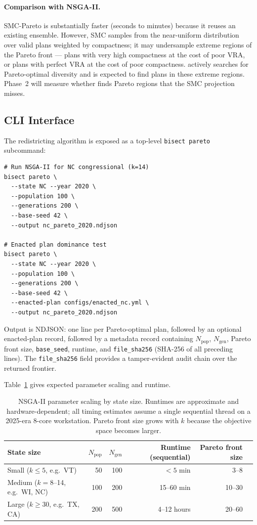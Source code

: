 \paragraph{Comparison with NSGA-II.}
SMC-Pareto is substantially faster (seconds to minutes) because it reuses
an existing ensemble.
However, SMC samples from the near-uniform distribution over valid plans
weighted by compactness; it may undersample extreme regions of the Pareto
front --- plans with very high compactness at the cost of poor VRA, or plans
with perfect VRA at the cost of poor compactness.
\nsga{} actively searches for Pareto-optimal diversity and is expected to
find plans in these extreme regions.
Phase~2 will measure whether \nsga{} finds Pareto regions that the SMC
projection misses.

\subsection{CLI Interface}

The \nsga{} redistricting algorithm is exposed as a top-level
\texttt{bisect pareto} subcommand:

\begin{verbatim}
# Run NSGA-II for NC congressional (k=14)
bisect pareto \
  --state NC --year 2020 \
  --population 100 \
  --generations 200 \
  --base-seed 42 \
  --output nc_pareto_2020.ndjson

# Enacted plan dominance test
bisect pareto \
  --state NC --year 2020 \
  --population 100 \
  --generations 200 \
  --base-seed 42 \
  --enacted-plan configs/enacted_nc.yml \
  --output nc_pareto_2020.ndjson
\end{verbatim}

Output is NDJSON: one line per Pareto-optimal plan, followed by an optional
enacted-plan record, followed by a metadata record containing
$N_{\mathrm{pop}}$, $N_{\mathrm{gen}}$, Pareto front size, \texttt{base\_seed},
runtime, and \texttt{file\_sha256} (SHA-256 of all preceding lines).
The \texttt{file\_sha256} field provides a tamper-evident audit chain over
the returned frontier.

Table~\ref{tab:scaling} gives expected parameter scaling and runtime.

\begin{table}[t]
\centering
\caption{%
  NSGA-II parameter scaling by state size.
  Runtimes are approximate and hardware-dependent; all timing estimates
  assume a single sequential thread on a 2025-era 8-core workstation.
  Pareto front size grows with $k$ because the objective space becomes larger.
}
\label{tab:scaling}
\renewcommand{\arraystretch}{1.3}
\begin{tabular}{@{}lrrrrl@{}}
\toprule
State size & $N_{\mathrm{pop}}$ & $N_{\mathrm{gen}}$ &
  Runtime (sequential) & Pareto front size \\
\midrule
Small ($k \leq 5$, e.g.\ VT) & 50 & 100 & $<5$ min & 3--8 \\
Medium ($k = 8$--14, e.g.\ WI, NC) & 100 & 200 & 15--60 min & 10--30 \\
Large ($k \geq 30$, e.g.\ TX, CA) & 200 & 500 & 4--12 hours & 20--60 \\
\bottomrule
\end{tabular}
\end{table}
